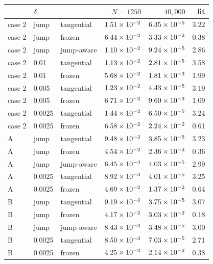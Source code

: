 \begin{tabular}{@{}lllrrr@{}}
\toprule
 & $\delta$ &  & $N = 1250$ & $40{,}000$ & fit \\
\midrule
case 2 & jump & tangential & $1.51 \times 10^{-2}$ & $6.35 \times 10^{-5}$ & 3.22 \\
case 2 & jump & frozen & $6.44 \times 10^{-2}$ & $3.33 \times 10^{-2}$ & 0.38 \\
case 2 & jump & jump-aware & $1.10 \times 10^{-2}$ & $9.24 \times 10^{-5}$ & 2.86 \\
case 2 & 0.01 & tangential & $1.13 \times 10^{-2}$ & $2.81 \times 10^{-5}$ & 3.58 \\
case 2 & 0.01 & frozen & $5.68 \times 10^{-2}$ & $1.81 \times 10^{-3}$ & 1.99 \\
case 2 & 0.005 & tangential & $1.23 \times 10^{-2}$ & $4.43 \times 10^{-5}$ & 3.19 \\
case 2 & 0.005 & frozen & $6.71 \times 10^{-2}$ & $9.60 \times 10^{-3}$ & 1.09 \\
case 2 & 0.0025 & tangential & $1.44 \times 10^{-2}$ & $6.50 \times 10^{-5}$ & 3.24 \\
case 2 & 0.0025 & frozen & $6.58 \times 10^{-2}$ & $2.24 \times 10^{-2}$ & 0.61 \\
\midrule
A & jump & tangential & $9.48 \times 10^{-3}$ & $3.85 \times 10^{-5}$ & 3.23 \\
A & jump & frozen & $4.54 \times 10^{-2}$ & $2.36 \times 10^{-2}$ & 0.36 \\
A & jump & jump-aware & $6.45 \times 10^{-3}$ & $4.03 \times 10^{-5}$ & 2.99 \\
A & 0.0025 & tangential & $8.92 \times 10^{-3}$ & $4.01 \times 10^{-5}$ & 3.25 \\
A & 0.0025 & frozen & $4.69 \times 10^{-2}$ & $1.37 \times 10^{-2}$ & 0.64 \\
\midrule
B & jump & tangential & $9.19 \times 10^{-3}$ & $3.75 \times 10^{-5}$ & 3.07 \\
B & jump & frozen & $4.17 \times 10^{-2}$ & $3.03 \times 10^{-2}$ & 0.18 \\
B & jump & jump-aware & $8.43 \times 10^{-3}$ & $3.48 \times 10^{-5}$ & 3.00 \\
B & 0.0025 & tangential & $8.50 \times 10^{-3}$ & $7.03 \times 10^{-5}$ & 2.71 \\
B & 0.0025 & frozen & $4.25 \times 10^{-2}$ & $2.14 \times 10^{-2}$ & 0.38 \\
\bottomrule
\end{tabular}
